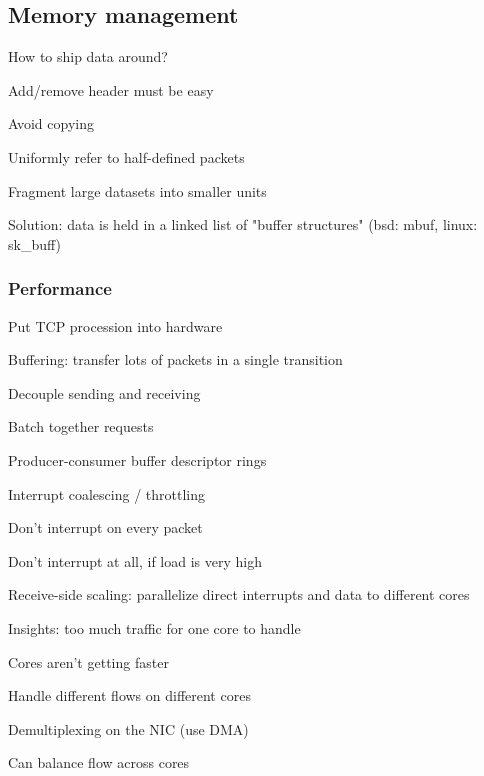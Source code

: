 \subsection{Memory management}
\enumstart
	\item How to ship data around?
	\item Add/remove header must be easy
	\item Avoid copying
	\item Uniformly refer to half-defined packets
	\item Fragment large datasets into smaller units
	\item Solution: data is held in a linked list of "buffer structures" (bsd: mbuf, linux: sk\_buff)
\enumend

\subsubsection{Performance}
\enumstart
	\item Put TCP procession into hardware
	\item Buffering: transfer lots of packets in a single transition
	\enumstart
		\item Decouple sending and receiving
		\item Batch together requests
		\item Producer-consumer buffer descriptor rings
	\enumend
	\item Interrupt coalescing / throttling
	\enumstart
		\item Don't interrupt on every packet
		\item Don't interrupt at all, if load is very high
	\enumend
	\item Receive-side scaling: parallelize \arrow direct interrupts and data to different cores
	\enumstart
		\item Insights: too much traffic for one core to handle
		\item Cores aren't getting faster
		\item Handle different flows on different cores
		\item Demultiplexing on the NIC (\arrow use DMA)
		\item Can balance flow across cores
	\enumend
\enumend
